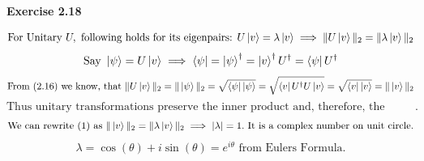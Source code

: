 \documentclass{article}
\begin{document}
\bigskip

\begin{framed}
    \noindent \textbf{Exercise 2.18}
    
    \medskip

         \begin{equation}
          \text{For Unitary } U, \text{ following holds for its eigenpairs: } U\ket{v} = \lambda \ket{v} \implies \|U\ket{v}\|_2 = \| \lambda \ket{v}\|_2
      \end{equation}
      \begin{equation}
          \text{Say } \ket{\psi} = U\ket{v} \implies \bra{\psi} = \ket{\psi}^{\dagger} = \ket{v}^{\dagger}U^{\dagger} = \bra{\psi}U^{\dagger}
      \end{equation}
      $$
      \text{From } (2.16) \text{ we know, that } \|U\ket{v}\|_2 = \|\ket{\psi}\|_2 = \sqrt{\bra{\psi}\ket{\psi}} = \sqrt{\bra{v}U^{\dagger}U\ket{v}} = \sqrt{\bra{v}\ket{v}} = \|\ket{v}\|_2
      $$
      $$
      \text{Thus unitary transformations preserve the inner product and, therefore, the Euclidean      norm of vectors}.
      $$
      $$
      \text{We can rewrite } (1) \text{ as } \|\ket{v}\|_2 = \| \lambda \ket{v} \|_2 \implies | \lambda | = 1. \text{ It is a complex number on unit circle}.
      $$
      $$
      \lambda = \cos(\theta) + i \sin(\theta) = e^{i \theta} \text{ from Eulers Formula}.
    $$

    
    
\end{framed}

\bigskip
\end{document}
